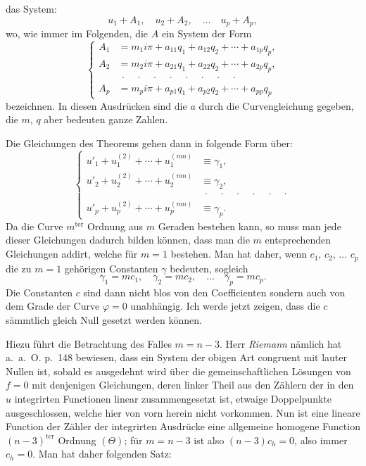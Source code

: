 \documentclass{article}
\begin{document}
das System:
\[ u_{1} + A_{1}, \quad u_{2} + A_{2}, \quad \ldots \quad u_{p} + A_{p}, \]
wo, wie immer im Folgenden, die $A$ ein System der Form
\[
\left\{
\begin{aligned}
A_{1} &= m_{1}i\pi + a_{11}q_{1} + a_{12}q_{2} + \cdots + a_{1p}q_{p}, \\
A_{2} &= m_{2}i\pi + a_{21}q_{1} + a_{22}q_{2} + \cdots + a_{2p}q_{p}, \\
&\ \cdot\quad\cdot\quad\cdot\quad\cdot\quad\cdot\quad\cdot\quad\cdot\quad\cdot \\
A_{p} &= m_{p}i\pi + a_{p1}q_{1} + a_{p2}q_{2} + \cdots + a_{pp}q_{p}
\end{aligned}
\right.
\tag{5.}
\]
bezeichnen. In diesen Ausdrücken sind die $a$ durch die Curvengleichung gegeben, die $m$, $q$ aber bedeuten ganze Zahlen.

Die Gleichungen des Theorems gehen dann in folgende Form über:
\[
\left\{
\begin{aligned}
u'_{1} + u_{1}^{(2)} + \cdots + u_{1}^{(mn)} &\equiv \gamma_{1}, \\
u'_{2} + u_{2}^{(2)} + \cdots + u_{2}^{(mn)} &\equiv \gamma_{2}, \\
&\ \cdot\quad\cdot\quad\cdot\quad\cdot\quad\cdot\quad\cdot \\
u'_{p} + u_{p}^{(2)} + \cdots + u_{p}^{(mn)} &\equiv \gamma_{p}.
\end{aligned}
\right.
\tag{6.}
\]
Da die Curve $m^{\text{ter}}$ Ordnung aus $m$ Geraden bestehen kann, so muss man jede dieser Gleichungen dadurch bilden können, dass man die $m$ entsprechenden Gleichungen addirt, welche für $m = 1$ bestehen. Man hat daher, wenn $c_{1}$, $c_{2}$, $\ldots$ $c_{p}$ die zu $m = 1$ gehörigen Constanten $\gamma$ bedeuten, sogleich
\[ \gamma_{1} = mc_{1}, \quad \gamma_{2} = mc_{2}, \quad \ldots \quad \gamma_{p} = mc_{p}. \]
Die Constanten $c$ sind dann nicht blos von den Coefficienten sondern auch von dem Grade der Curve $\varphi = 0$ unabhängig. Ich werde jetzt zeigen, dass die $c$ sämmtlich gleich Null gesetzt werden können.

Hiezu führt die Betrachtung des Falles $m = n-3$. Herr \emph{Riemann} nämlich hat a.\ a.\ O. p.\ 148 bewiesen, dass ein System der obigen Art congruent mit lauter Nullen ist, sobald es ausgedehnt wird über die gemeinschaftlichen Lösungen von $f = 0$ mit denjenigen Gleichungen, deren linker Theil aus den Zählern der in den $u$ integrirten Functionen linear zusammengesetzt ist, etwaige Doppelpunkte ausgeschlossen, welche hier von vorn herein nicht vorkommen. Nun ist eine lineare Function der Zähler der integrirten Ausdrücke eine allgemeine homogene Function $(n-3)^{\text{ter}}$ Ordnung $(\Theta)$; für $m = n-3$ ist also $(n-3)c_{h} = 0$, also immer $c_{h} = 0$. Man hat daher folgenden Satz:
\end{document}
